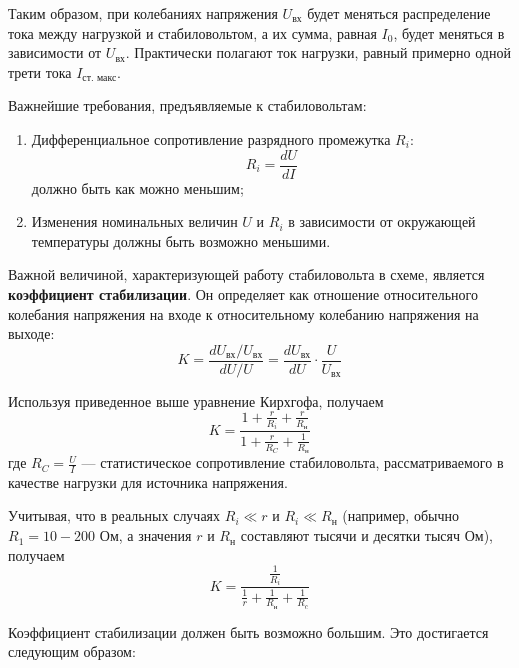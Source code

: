 \documentclass[a4paper, 12pt]{article}
\begin{document}
	Таким образом, при колебаниях напряжения $U_\text{вх}$ будет меняться распределение тока между нагрузкой и стабиловольтом, а их сумма, равная $I_0$, будет меняться в зависимости от $U_\text{вх}$. Практически полагают ток нагрузки, равный примерно одной трети тока $I_\text{ст. макс}$.\par
	Важнейшие требования, предъявляемые к стабиловольтам:\par
	\begin{enumerate}
		\item Дифференциальное сопротивление разрядного промежутка $R_i$:
		\begin{equation}
			R_i=\frac{dU}{dI}
		\end{equation}
		должно быть как можно меньшим;
		\item Изменения номинальных величин $U$ и $R_i$ в зависимости от окружающей температуры должны быть возможно меньшими.
	\end{enumerate}
	Важной величиной, характеризующей работу стабиловольта в схеме, является \textbf{коэффициент стабилизации}. Он определяет как отношение относительного колебания напряжения на входе к относительному колебанию напряжения на выходе:
	\begin{equation}
		K=\frac{dU_\text{вх}/U_\text{вх}}{dU/U}=\frac{dU_\text{вх}}{dU}\cdot\frac{U}{U_\text{вх}}
	\end{equation}\par
	Используя приведенное выше уравнение Кирхгофа, получаем
	\begin{equation}
		K=\frac{1+\frac{r}{R_i}+\frac{r}{R_\text{н}}}{1+\frac{r}{R_C}+\frac{1}{R_\text{н}}}
	\end{equation}
	где $R_C=\frac{U}{I}$ — статистическое сопротивление стабиловольта, рассматриваемого в качестве нагрузки для источника напряжения.\par
	Учитывая, что в реальных случаях $R_i\ll r$ и $R_i\ll R_\text{н}$ (например, обычно $R_1=10-200$ Ом, а значения $r$ и $R_\text{н}$ составляют тысячи и десятки тысяч Ом), получаем
	\begin{equation}
		K=\frac{\frac{1}{R_i}}{\frac{1}{r}+\frac{1}{R_\text{н}}+\frac{1}{R_c}}
	\end{equation}
	\par
	Коэффициент стабилизации должен быть возможно большим. Это достигается следующим образом:
\end{document}
